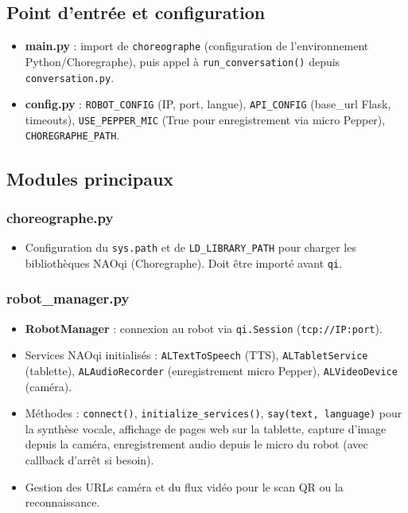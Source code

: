 \documentclass[12pt,a4paper]{article}
\begin{document}
\subsection{Point d'entrée et configuration}

\begin{itemize}[noitemsep]
  \item \textbf{main.py} : import de \texttt{choreographe} (configuration de l'environnement Python/Choregraphe), puis appel à \texttt{run\_conversation()} depuis \texttt{conversation.py}.
  \item \textbf{config.py} : \texttt{ROBOT\_CONFIG} (IP, port, langue), \texttt{API\_CONFIG} (base\_url Flask, timeouts), \texttt{USE\_PEPPER\_MIC} (True pour enregistrement via micro Pepper), \texttt{CHOREGRAPHE\_PATH}.
\end{itemize}

\subsection{Modules principaux}

\subsubsection{choreographe.py}

\begin{itemize}[noitemsep]
  \item Configuration du \texttt{sys.path} et de \texttt{LD\_LIBRARY\_PATH} pour charger les bibliothèques NAOqi (Choregraphe). Doit être importé avant \texttt{qi}.
\end{itemize}

\subsubsection{robot\_manager.py}

\begin{itemize}[noitemsep]
  \item \textbf{RobotManager} : connexion au robot via \texttt{qi.Session} (\texttt{tcp://IP:port}).
  \item Services NAOqi initialisés : \texttt{ALTextToSpeech} (TTS), \texttt{ALTabletService} (tablette), \texttt{ALAudioRecorder} (enregistrement micro Pepper), \texttt{ALVideoDevice} (caméra).
  \item Méthodes : \texttt{connect()}, \texttt{initialize\_services()}, \texttt{say(text, language)} pour la synthèse vocale, affichage de pages web sur la tablette, capture d'image depuis la caméra, enregistrement audio depuis le micro du robot (avec callback d'arrêt si besoin).
  \item Gestion des URLs caméra et du flux vidéo pour le scan QR ou la reconnaissance.
\end{itemize}
\end{document}
